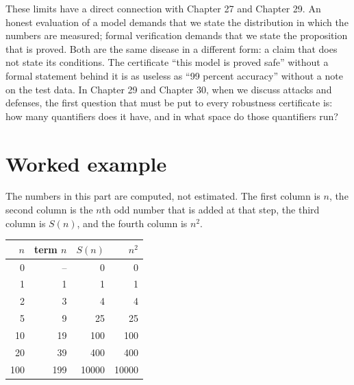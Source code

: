 
These limits have a direct connection with Chapter 27 and Chapter 29. An honest evaluation of a model
demands that we state the distribution in which the numbers are measured; formal verification
demands that we state the proposition that is proved. Both are the same disease in a different form:
a claim that does not state its conditions. The certificate ``this model is proved safe'' without a
formal statement behind it is as useless as ``99 percent accuracy'' without a note on the test data.
In Chapter 29 and Chapter 30, when we discuss attacks and defenses, the first question that must be
put to every robustness certificate is: how many quantifiers does it have, and in what space do those
quantifiers run?

\section{Worked example}


The numbers in this part are computed, not estimated. The first column is $n$, the second column is
the $n$th odd number that is added at that step, the third column is $S(n)$, and the fourth column is
$n^{2}$.

\begin{center}
\begin{tabular}{rrrr}
\hline
$n$ & term $n$ & $S(n)$ & $n^{2}$ \\
\hline
0  & --  & 0     & 0 \\
1  & 1   & 1     & 1 \\
2  & 3   & 4     & 4 \\
5  & 9   & 25    & 25 \\
10 & 19  & 100   & 100 \\
20 & 39  & 400   & 400 \\
100 & 199 & 10000 & 10000 \\
\hline
\end{tabular}
\end{center}

